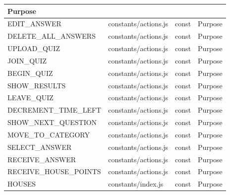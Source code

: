 \begin{table}[]
\begin{tabular}{|l|l|l|l|}
Purpose \\ \hline EDIT\_ANSWER & constants/actions.js & const & Purpose \\ \hline DELETE\_ALL\_ANSWERS & constants/actions.js & const & Purpose \\ \hline UPLOAD\_QUIZ & constants/actions.js & const & Purpose \\ \hline JOIN\_QUIZ & constants/actions.js & const & Purpose \\ \hline BEGIN\_QUIZ & constants/actions.js & const & Purpose \\ \hline SHOW\_RESULTS & constants/actions.js & const & Purpose \\ \hline LEAVE\_QUIZ & constants/actions.js & const & Purpose \\ \hline DECREMENT\_TIME\_LEFT & constants/actions.js & const & Purpose \\ \hline SHOW\_NEXT\_QUESTION & constants/actions.js & const & Purpose \\ \hline MOVE\_TO\_CATEGORY & constants/actions.js & const & Purpose \\ \hline SELECT\_ANSWER & constants/actions.js & const & Purpose \\ \hline RECEIVE\_ANSWER & constants/actions.js & const & Purpose \\ \hline RECEIVE\_HOUSE\_POINTS & constants/actions.js & const & Purpose \\ \hline HOUSES & constants/index.js & const & Purpose \\ \hline
\end{tabular}
\end{table}



